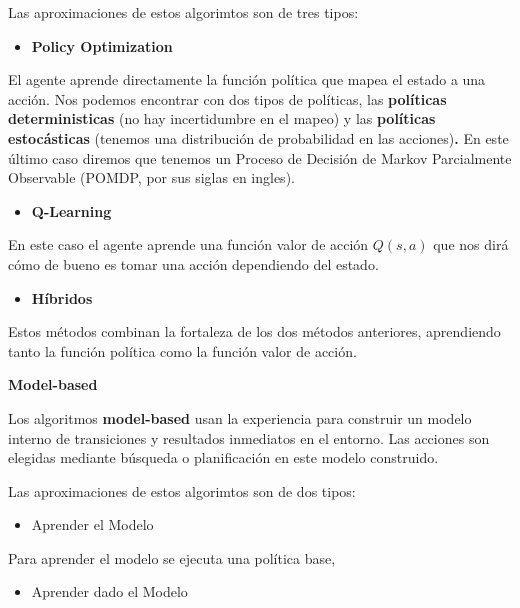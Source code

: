 \documentclass[
  a4paper,
  DIV=11,
  numbers=noendperiod]{scrreprt}
\providecommand{\tightlist}{%
  \setlength{\itemsep}{0pt}\setlength{\parskip}{0pt}}\usepackage{longtable,booktabs,array}
\begin{document}
Las aproximaciones de estos algorimtos son de tres tipos:

\begin{itemize}
\tightlist
\item
  \textbf{Policy Optimization}
\end{itemize}

El agente aprende directamente la función política que mapea el estado a
una acción. Nos podemos encontrar con dos tipos de políticas, las
\textbf{políticas deterministicas} (no hay incertidumbre en el mapeo) y
las \textbf{políticas estocásticas} (tenemos una distribución de
probabilidad en las acciones)\textbf{.} En este último caso diremos que
tenemos un Proceso de Decisión de Markov Parcialmente Observable (POMDP,
por sus siglas en ingles).

\begin{itemize}
\tightlist
\item
  \textbf{Q-Learning}
\end{itemize}

En este caso el agente aprende una función valor de acción \(Q(s,a)\)
que nos dirá cómo de bueno es tomar una acción dependiendo del estado.

\begin{itemize}
\tightlist
\item
  \textbf{Híbridos}
\end{itemize}

Estos métodos combinan la fortaleza de los dos métodos anteriores,
aprendiendo tanto la función política como la función valor de acción.

\textbf{Model-based}

Los algoritmos \textbf{model-based} usan la experiencia para construir
un modelo interno de transiciones y resultados inmediatos en el entorno.
Las acciones son elegidas mediante búsqueda o planificación en este
modelo construido.

Las aproximaciones de estos algorimtos son de dos tipos:

\begin{itemize}
\tightlist
\item
  Aprender el Modelo
\end{itemize}

Para aprender el modelo se ejecuta una política base,

\begin{itemize}
\tightlist
\item
  Aprender dado el Modelo
\end{itemize}
\end{document}
